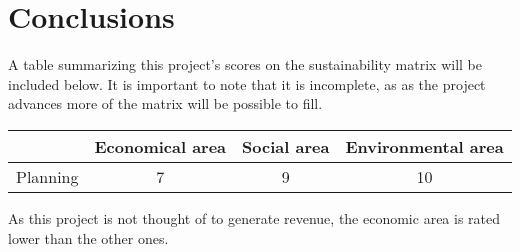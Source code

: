 \section{Conclusions}

A table summarizing this project's scores on the sustainability matrix will be included below. It is important to note that it is incomplete, as as the project advances more of the matrix will be possible to fill.

\begin{center}
  \begin{tabular}{ | c | c | c | c | }
    \hline
         &
        \textbf{Economical area} &
        \textbf{Social area} &
         \textbf{Environmental area} \\ 
        \hline
        Planning & 7 & 9 & 10 \\  
        \hline
  \end{tabular}
\end{center}

As this project is not thought of to generate revenue, the economic area is rated lower than the other ones. 
